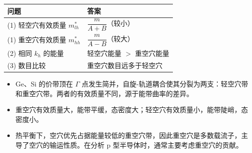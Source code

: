 \begin{formulabox}[答案汇总]
\begin{center}
\begin{tabular}{ll}
\toprule
\textbf{问题} & \textbf{答案} \\
\midrule
(1) 轻空穴有效质量 $m_{lh}^*$ & $\dfrac{m}{A+B}$（较小） \\
(1) 重空穴有效质量 $m_{hh}^*$ & $\dfrac{m}{A-B}$（较大） \\
(2) 相同 $k_h$ 的能量 & 轻空穴能量 $>$ 重空穴能量 \\
(3) 数目比较 & 重空穴数目远多于轻空穴 \\
\bottomrule
\end{tabular}
\end{center}
\end{formulabox}

\begin{insightbox}[物理图像]
\begin{itemize}
    \item Ge、Si 的价带顶在 $\Gamma$ 点发生简并，自旋-轨道耦合使其分裂为两支：轻空穴带和重空穴带。两者的有效质量不同，源于能带曲率的差异。
    \item 重空穴有效质量大，能带平缓，态密度大；轻空穴有效质量小，能带陡峭，态密度小。
    \item 热平衡下，空穴优先占据能量较低的重空穴带，因此重空穴是多数载流子，主导了空穴的输运性质。在分析 p 型半导体时，通常主要考虑重空穴的贡献。
\end{itemize}
\end{insightbox}
